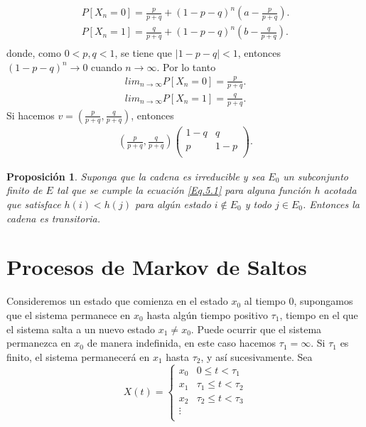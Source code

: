 \documentclass{article}
\newtheorem{Prop}{Proposición}[section]
\numberwithin{equation}{section}
\begin{document}
\begin{eqnarray*}
P\left[X_{n}=0\right]=\frac{p}{p+q}+\left(1-p-q\right)^{n}\left(a-\frac{p}{p+q}\right).\\
P\left[X_{n}=1\right]=\frac{q}{p+q}+\left(1-p-q\right)^{n}\left(b-\frac{q}{p+q}\right).\\
\end{eqnarray*}
donde, como $0<p,q<1$, se tiene que $|1-p-q|<1$, entonces $\left(1-p-q\right)^{n}\rightarrow 0$ cuando $n\rightarrow\infty$. Por lo tanto
\begin{eqnarray*}
lim_{n\rightarrow\infty}P\left[X_{n}=0\right]=\frac{p}{p+q}.\\
lim_{n\rightarrow\infty}P\left[X_{n}=1\right]=\frac{q}{p+q}.
\end{eqnarray*}
Si hacemos $v=\left(\frac{p}{p+q},\frac{q}{p+q}\right)$, entonces
\begin{eqnarray*}
\left(\frac{p}{p+q},\frac{q}{p+q}\right)\left(\begin{array}{cc}
1-q & q\\
p & 1-p\\
\end{array}\right).
\end{eqnarray*}

\begin{Prop}\label{Prop.5.4}
Suponga que la cadena es irreducible y sea $E_{0}$ un subconjunto finito de $E$ tal que se cumple la ecuaci\'on \ref{Eq.5.1} para alguna funci\'on $h$ acotada que satisface $h\left(i\right)<h\left(j\right)$ para alg\'un estado $i\notin E_{0}$ y todo $j\in E_{0}$. Entonces la cadena es transitoria.
\end{Prop}

\section{Procesos de Markov de Saltos}
Consideremos un estado que comienza en el estado $x_{0}$ al tiempo $0$, supongamos que el sistema permanece en $x_{0}$ hasta alg\'un tiempo positivo $\tau_{1}$, tiempo en el que el sistema salta a un nuevo estado $x_{1}\neq x_{0}$. Puede ocurrir que el sistema permanezca en $x_{0}$ de manera indefinida, en este caso hacemos $\tau_{1}=\infty$. Si $\tau_{1}$ es finito, el sistema permanecer\'a en $x_{1}$ hasta $\tau_{2}$, y as\'i sucesivamente.
Sea
\begin{equation}
X\left(t\right)=\left\{\begin{array}{cc}
x_{0} & 0\leq t<\tau_{1}\\
x_{1} & \tau_{1}\leq t<\tau_{2}\\
x_{2} & \tau_{2}\leq t<\tau_{3}\\
\vdots &\\
\end{array}\right.
\end{equation}
\end{document}

